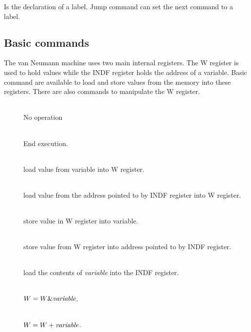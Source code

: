 \documentclass[11pt]{scrartcl}
\newcommand{\declaration}[2]{\vspace*{2ex}#1\begin{addmargin}{1cm}{#2}\end{addmargin}}
\begin{document}
\declaration{\lit*{:}}{Is the declaration of a label. Jump command can set the next command to a label.}

\subsection{Basic commands}
The van Neumann machine uses two main internal registers. The W register is used to hold values while the INDF register holds the address of a variable. Basic command are available to load and store values from the memory into these registers. There are also commands to manipulate the W register.

\begin{addmargin}{1cm}
\begin{description}
\item[] \hfill\\ 
  No operation

\item[]  \hfill\\  
End execution.

\item[ ] \hfill\\ 
 load value from variable into W register.

\item[]\hfill\\ 
load value from the address pointed to by INDF register into W register.

\item[ ] \hfill\\  
store value in W register into variable.

\item[] \hfill\\  
store value from W register into address pointed to by INDF register.

\item[ ] \hfill\\  
load the contents of {\it variable} into the INDF register.

\item[ ]  \hfill\\ 
 $W = W \& \text{{\it variable}}$.

\item[ ]  \hfill\\  
$W = W +  \text{{\it variable}}$.


\end{description}
\end{addmargin}
\end{document}
